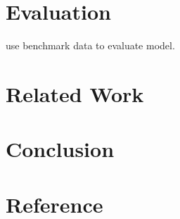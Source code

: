 \documentclass{article}
\begin{document}
\section{Evaluation}
use benchmark data to evaluate model.

\section{Related Work}


\section{Conclusion}


\section*{Reference}
\end{document}
